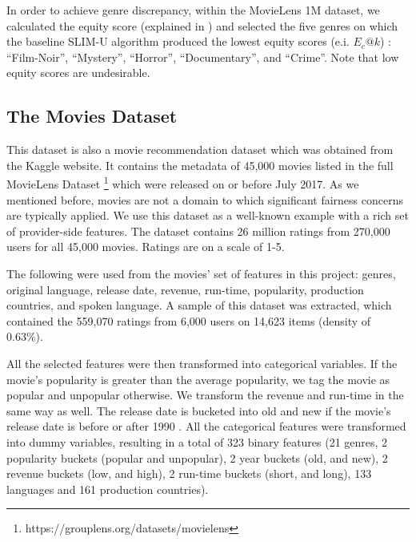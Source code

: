         In order to achieve genre discrepancy, within the MovieLens 1M dataset, we calculated the equity score (explained in ) and selected the five genres on which the baseline SLIM-U algorithm produced the lowest equity scores (e.i. $E_c@k$) : ``Film-Noir'', ``Mystery'', ``Horror'', ``Documentary'', and ``Crime''. Note that low equity scores are undesirable.
        



    \subsection{The Movies Dataset}
    
    This dataset is also a movie recommendation dataset which was obtained from the Kaggle website. It contains the metadata of 45,000 movies listed in the full MovieLens Dataset \footnote{https://grouplens.org/datasets/movielens} which were released on or before July 2017. As we mentioned before, movies are not a domain to which significant fairness concerns are typically applied. We use this dataset as a well-known example with a rich set of provider-side features. The dataset contains 26 million ratings from 270,000 users for all 45,000 movies. Ratings are on a scale of 1-5.
    
    The following were used from the movies' set of features in this project: genres, original language, release date, revenue, run-time, popularity, production countries, and spoken language. A sample of this dataset was extracted, which contained the 559,070 ratings from 6,000 users on 14,623 items (density of 0.63\%).

    All the selected features were then transformed into categorical variables. If the movie's popularity is greater than the average popularity, we tag the movie as popular and unpopular otherwise. We transform the revenue and run-time in the same way as well. The release date is bucketed into old and new if the movie's release date is before or after 1990 \cite{kamishima2016model}. All the categorical features were transformed into dummy variables, resulting in a total of 323 binary features (21 genres, 2 popularity buckets (popular and unpopular), 2 year buckets (old, and new), 2 revenue buckets (low, and high), 2 run-time buckets (short, and long), 133 languages and 161 production countries).
    
